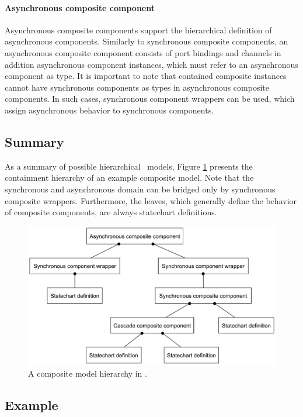 \paragraph{Asynchronous composite component}
Asynchronous composite components support the hierarchical definition of asynchronous
components. Similarly to synchronous composite components, an asynchronous composite
component consists of port bindings and channels in addition asynchronous component instances,
which must refer to an asynchronous component as type. It is important to note that
contained composite instances cannot have synchronous components as types in asynchronous
composite components. In such cases, synchronous component wrappers can be used, which
assign asynchronous behavior to synchronous components.

\subsection{Summary}
As a summary of possible hierarchical \gamma\ models, Figure \ref{fig:gamma-object-tree} presents the containment hierarchy of an example composite model. Note that the synchronous and asynchronous domain can be bridged only by synchronous composite wrappers. Furthermore, the leaves, which generally define the behavior of composite components, are always statechart definitions.

\begin{figure}[htbp]
	\center
	\includegraphics[width=1.0\linewidth]{figures/gamma_object_tree.pdf}
	\caption{A composite model hierarchy in \gamma.}
	\label{fig:gamma-object-tree}
\end{figure}

\subsection{Example}



